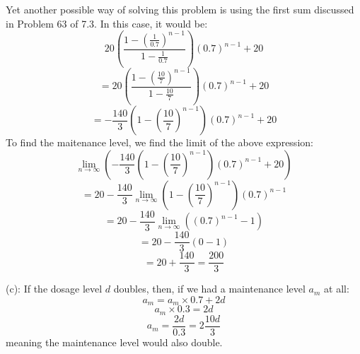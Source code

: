 \documentclass{article}
\theoremstyle{definition}
\newcommand{\?}{\stackrel{?}{=}}
\begin{document}
Yet another possible way of solving this problem is using the first sum discussed in Problem 63 of 7.3. In this case, it would be:
\[ 20\left(\dfrac{1-(\frac{1}{0.7})^{n-1}}{1-\frac{1}{0.7}}\right)(0.7)^{n-1}+20 \]
\[ =20\left(\dfrac{1-(\frac{10}{7})^{n-1}}{1-\frac{10}{7}}\right)(0.7)^{n-1}+20 \]
\[ =-\frac{140}{3}\left(1-(\frac{10}{7})^{n-1}\right)(0.7)^{n-1}+20 \]
To find the maitenance level, we find the limit of the above expression:
\[ \lim_{n\rightarrow\infty}\left(-\frac{140}{3}\left(1-(\frac{10}{7})^{n-1}\right)(0.7)^{n-1}+20\right) \]
\[ =20-\frac{140}{3}\lim_{n\rightarrow\infty}\left(1-(\frac{10}{7})^{n-1}\right)(0.7)^{n-1} \]
\[ =20-\frac{140}{3}\lim_{n\rightarrow\infty}\left((0.7)^{n-1}-1\right) \]
\[ =20-\frac{140}{3}(0-1) \]
\[ =20+\frac{140}{3}=\frac{200}{3} \]


(c): If the dosage level $d$ doubles, then, if we had a maintenance level $a_m$ at all:
\[ a_m=a_m\times 0.7+2d \] \[ a_m\times 0.3=2d \] \[ a_m=\frac{2d}{0.3}=2\frac{10d}{3} \] meaning the maintenance level would also double.
\end{document}
